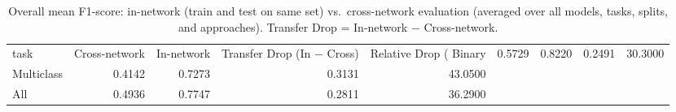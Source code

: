 \begin{table}
\caption{Overall mean F1-score: in-network (train and test on same set) vs.\ cross-network evaluation (averaged over all models, tasks, splits, and approaches). Transfer Drop = In-network $-$ Cross-network.}
\label{tab:q3_overall}
\begin{tabular}{lrrrr}
\toprule
task & Cross-network & In-network & Transfer Drop (In − Cross) & Relative Drop (%
\midrule
Binary & 0.5729 & 0.8220 & 0.2491 & 30.3000 \\
Multiclass & 0.4142 & 0.7273 & 0.3131 & 43.0500 \\
All & 0.4936 & 0.7747 & 0.2811 & 36.2900 \\
\bottomrule
\end{tabular}
\end{table}
